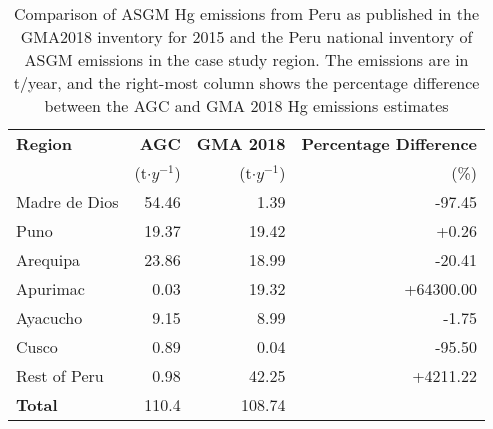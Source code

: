 \setlength{\tabcolsep}{5pt}
\begin{table}[H]
  \begin{center}
    \caption{Comparison of ASGM Hg emissions from Peru as published in the GMA2018 inventory for 2015 and the Peru national inventory of ASGM emissions in the case study region. The emissions are in t/year, and the right-most column shows the percentage difference between the AGC and GMA 2018 Hg emissions estimates }
    \label{tab:agc_vs_gma18}
    \begin{tabular}{lrrr}
      
    \textbf{Region}     & \textbf{AGC}      & \textbf{GMA 2018}             & \textbf{Percentage Difference}       \\
                        & (t$\cdot y^{-1}$) & (t$\cdot y^{-1}$)                    &        (\%)\\
\hline    
    Madre de Dios       & 54.46             & 1.39                          &    -97.45       \\
    Puno                & 19.37             & 19.42                         &    +0.26     \\
    Arequipa            & 23.86             & 18.99                         &    -20.41       \\ %
    Apurimac            & 0.03              & 19.32                         &    +64300.00    \\
    Ayacucho            & 9.15              & 8.99                          &    -1.75           \\ %
    Cusco               & 0.89              & 0.04                          &    -95.50           \\
    Rest of Peru        &  0.98             & 42.25                         &    +4211.22        \\
   
    \hline
    \textbf{Total}           &110.4             &108.74     &        \\
    \end{tabular}
  \end{center}
\end{table}

